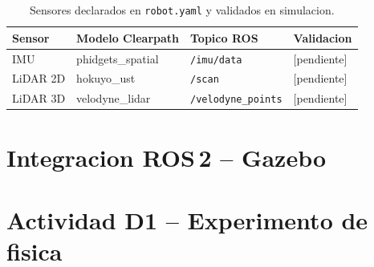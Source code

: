 \documentclass[11pt,a4paper]{article}
\begin{document}

\begin{table}[H]
  \centering
  \caption{Sensores declarados en \texttt{robot.yaml} y validados en simulacion.}
  \label{tab:sensores}
  \begin{tabularx}{\linewidth}{lllX}
    \toprule
    Sensor    & Modelo Clearpath  & Topico ROS         & Validacion \\
    \midrule
    IMU       & phidgets\_spatial & \texttt{/imu/data}        & [pendiente] \\
    LiDAR 2D  & hokuyo\_ust       & \texttt{/scan}            & [pendiente] \\
    LiDAR 3D  & velodyne\_lidar   & \texttt{/velodyne\_points}& [pendiente] \\
    \bottomrule
  \end{tabularx}
\end{table}

\section{Integracion ROS\,2 -- Gazebo}
\label{sec:integracion}



\section{Actividad D1 -- Experimento de fisica}
\label{sec:d1}

\end{document}
